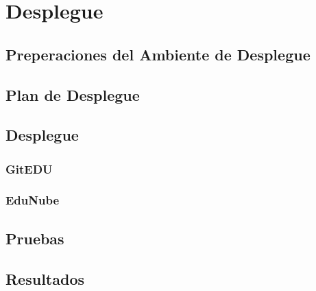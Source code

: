 
\chapter{Desplegue}
\label{capitulo6}

\section{Preperaciones del Ambiente de Desplegue}

\section{Plan de Desplegue}

\section{Desplegue}

\subsection{GitEDU}

\subsection{EduNube}

\section{Pruebas}

\section{Resultados}

